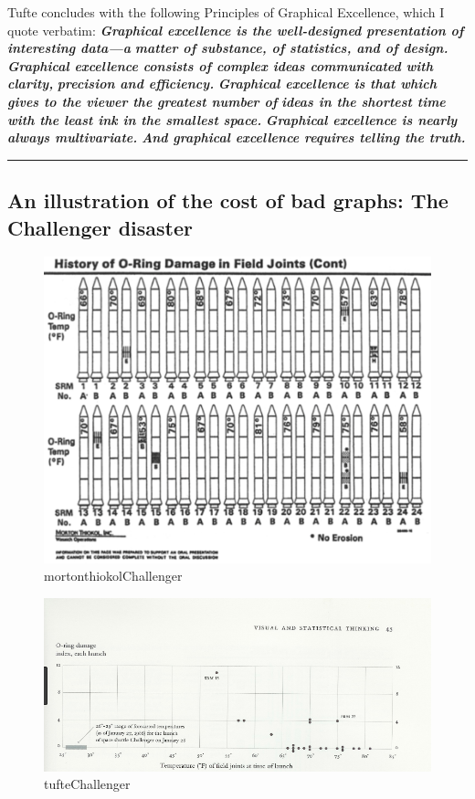 \documentclass[openany]{book}
\begin{document}
Tufte concludes with the following Principles of Graphical Excellence, which I quote verbatim:
\textbf{\emph{Graphical excellence is the well-designed presentation of interesting data---a}}
\textbf{\emph{matter of substance, of statistics, and of design.}}
\textbf{\emph{Graphical excellence consists of complex ideas communicated with clarity,}}
\textbf{\emph{precision and efficiency.}}
\textbf{\emph{Graphical excellence is that which gives to the viewer the greatest number of}}
\textbf{\emph{ideas in the shortest time with the least ink in the smallest space.}}
\textbf{\emph{Graphical excellence is nearly always multivariate.}}
\textbf{\emph{And graphical excellence requires telling the truth.}}

\begin{center}\rule{0.5\linewidth}{\linethickness}\end{center}

\hypertarget{an-illustration-of-the-cost-of-bad-graphs-the-challenger-disaster}{%
\subsection{An illustration of the cost of bad graphs: The Challenger disaster}\label{an-illustration-of-the-cost-of-bad-graphs-the-challenger-disaster}}

\begin{figure}
\centering
\includegraphics{mortonthiokolChallenger.PNG}
\caption{mortonthiokolChallenger}
\end{figure}

\begin{figure}
\centering
\includegraphics{tufteChallenger.PNG}
\caption{tufteChallenger}
\end{figure}
\end{document}
